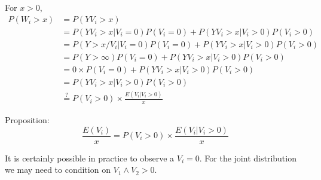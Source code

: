 \documentclass[12pt]{article}
\begin{document}
For $x>0$,
\begin{align*}
P(W_i > x) &= P(YV_i > x)  \\
 &= P(YV_i > x | V_i = 0)P(V_i = 0) + P(YV_i > x | V_i > 0)P(V_i > 0)  \\
 &= P(Y>x/V_i|V_i=0) P(V_i = 0) + P(YV_i > x | V_i > 0)P(V_i > 0)  \\
 &= P(Y>\infty) P(V_i = 0) + P(YV_i > x | V_i > 0)P(V_i > 0)  \\
 &= 0\times P(V_i = 0) + P(YV_i > x | V_i > 0)P(V_i > 0)  \\
 &= P(YV_i > x | V_i > 0)P(V_i > 0)  \\
 &\overset{?}{=} P(V_i>0)\times \frac{E(V_i|V_i>0)}{x}
\end{align*}

Proposition:
\[ \frac{E(V_i)}{x} = P(V_i > 0)\times \frac{E(V_i|V_i>0)}{x} \]

It is certainly possible in practice to observe a $V_i=0$. For the joint distribution we may need to condition on $V_1 \wedge V_2 > 0$.
\end{document}
